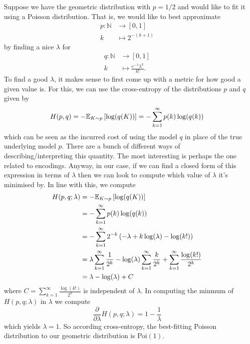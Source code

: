 \documentclass[11pt]{article}
\begin{document}
\begin{appendices}
Suppose we have the geometric distribution with $p=1/2$ and would like to fit it using a Poisson distribution. That is, we would like to best approximate
\begin{align*}
    p:\mathbb{N}&\to[0,1]\\
    k&\mapsto2^{-(k+1)}
\end{align*}
by finding a nice $\lambda$ for
\begin{align*}
    q:\mathbb{N}&\to[0,1]\\
    k&\mapsto\frac{e^{-\lambda}\lambda^k}{k!}.
\end{align*}
To find a good $\lambda$, it makes sense to first come up with a metric for how good a given value is. For this, we can use the cross-entropy of the distributions $p$ and $q$ given by
$$
H(p,q)
=
-\mathbb{E}_{K\sim p}\left[\log(q(K))\right]
=
-\sum_{k=1}^{\infty}p(k)\log(q(k))
$$
which can be seen as the incurred cost of using the model $q$ in place of the true underlying model $p$. There are a bunch of different ways of describing/interpreting this quantity. The most interesting is perhaps the one related to encodings. Anyway, in our case, if we can find a closed form of this expression in terms of $\lambda$ then we can look to compute which value of $\lambda$ it's minimised by. In line with this, we compute
\begin{align*}
    H(p,q;\lambda)
    &=
    -\mathbb{E}_{K\sim p}\left[\log(q(K))\right]\\
    &=
    -\sum_{k=1}^{\infty}p(k)\log(q(k))\\
    &=
    -\sum_{k=1}^{\infty}2^{-k}\left(-\lambda+k\log(\lambda)-\log(k!)\right)\\
    &=
    \lambda\sum_{k=1}^{\infty}\frac{1}{2^k}-\log(\lambda)\sum_{k=1}^{\infty}\frac{k}{2^k}+\sum_{k=1}^{\infty}\frac{\log(k!)}{2^k}\\
    &=
    \lambda-\log(\lambda)+C
\end{align*}
where $C=\sum_{k=1}^{\infty}\frac{\log(k!)}{2^k}$ is independent of $\lambda$. In computing the minmum of $H(p,q;\lambda)$ in $\lambda$ we compute
$$
\frac{\partial}{\partial \lambda}H(p,q;\lambda)
=
1-\frac{1}{\lambda}
$$
which yields $\lambda=1$. So according cross-entropy, the best-fitting Poisson distribution to our geometric distribution is Poi$(1)$.


\end{appendices}
\end{document}
